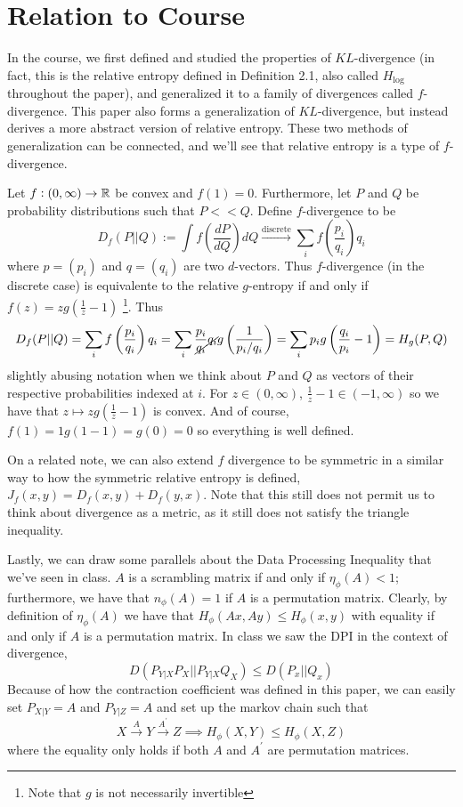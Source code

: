 \section{Relation to Course}
In the course, we first defined and studied the properties of $KL$-divergence (in fact, this is the relative entropy defined in Definition 2.1, also called $H_{\log}$ throughout the paper), and generalized it to a family of divergences called $f$-divergence. This paper also forms a generalization of $KL$-divergence, but instead derives a more abstract version of relative entropy. These two methods of generalization can be connected, and we'll see that relative entropy is a type of $f$-divergence. 

Let $f: (0, \infty) \to \mathbb{R}$ be convex and $f(1) = 0$. Furthermore, let $P$ and $Q$ be probability distributions such that $P <\!< Q$. Define $f$-divergence to be 
\[D_f(P || Q):= \int f\left(\frac{dP}{dQ}\right)dQ \xrightarrow{\text{discrete}} \sum_i f\left(\frac{p_i}{q_i}\right)q_i\]
where $p = (p_i)$ and $q = (q_i)$ are two $d$-vectors. Thus $f$-divergence (in the discrete case) is equivalente to the relative $g$-entropy if and only if $f(z) = z g\left(\frac{1}{z}-1\right)$ \footnote{Note that $g$ is not necessarily invertible}. Thus \[D_f(P|| Q) = \sum_i f\left(\frac{p_i}{q_i}\right)q_i = \sum_i \frac{p_i}{\cancel{q_i}}\cancel{q_i}g\left(\frac{1}{p_i/q_i}\right)=\sum_i p_i g\left(\frac{q_i}{p_i} - 1\right) = H_g(P, Q)\]
slightly abusing notation when we think about $P$ and $Q$ as vectors of their respective probabilities indexed at $i$. For $z \in (0, \infty)$, $\frac{1}{z}-1 \in (-1, \infty)$ so we have that $z \mapsto zg\left(\frac{1}{z}-1\right)$ is convex. And of course, $f(1) = 1g(1 - 1) = g(0) = 0$ so everything is well defined.

On a related note, we can also extend $f$ divergence to be symmetric in a similar way to how the symmetric relative entropy is defined, $J_{f}(x,y) = D_f(x,y) + D_f(y,x)$. Note that this still does not permit us to think about divergence as a metric, as it still does not satisfy the triangle inequality.

Lastly, we can draw some parallels about the Data Processing Inequality that we've seen in class. $A$ is a scrambling matrix if and only if $\eta_{\phi}(A) < 1$; furthermore, we have that $n_\phi(A)=1$ if $A$ is a permutation matrix. Clearly, by definition of $\eta_\phi(A)$ we have that $H_{\phi}(Ax,Ay)  \leq H_{\phi}(x,y)$ with equality if and only if $A$ is a permutation matrix. In class we saw the DPI in the context of divergence,\[D(P_{Y|X}P_X||P_{Y|X}Q_X) \leq D(P_x||Q_x)\] Because of how the contraction coefficient was defined in this paper, we can easily set $P_{X|Y} = A$ and $P_{Y|Z} = A$ and set up the markov chain such that 
\[X \xrightarrow{A} Y \xrightarrow{A^\prime} Z \implies H_{\phi}(X,Y) \leq H_{\phi}(X,Z)\]
where the equality only holds if both $A$ and $A^\prime$ are permutation matrices.

    